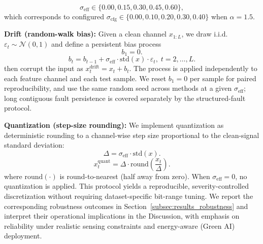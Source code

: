 \documentclass[review,1p,times]{elsarticle}
\begin{document}
\begin{equation}
\sigma_{\mathrm{eff}} \in \{0.00, 0.15, 0.30, 0.45, 0.60\},
\end{equation}
which corresponds to configured $\sigma_{\mathrm{cfg}}\in\{0.00,0.10,0.20,0.30,0.40\}$ when $\alpha=1.5$.

\noindent\textbf{Drift (random-walk bias):}
Given a clean channel $x_{1:L}$, we draw i.i.d.\ $\varepsilon_t\sim\mathcal{N}(0,1)$ and define a persistent bias process
\begin{equation}
b_1 = 0.
\end{equation}
\begin{equation}
b_t = b_{t-1} + \sigma_{\mathrm{eff}}\cdot \mathrm{std}(x)\cdot \varepsilon_t,\; t=2,\dots,L.
\end{equation}
then corrupt the input as $x^{\text{drift}}_t = x_t + b_t$. The process is applied independently to each feature channel and each test sample. We reset $b_1=0$ per sample for paired reproducibility, and use the same random seed across methods at a given $\sigma_{\mathrm{eff}}$; long contiguous fault persistence is covered separately by the structured-fault protocol.

\noindent\textbf{Quantization (step-size rounding):}
We implement quantization as deterministic rounding to a channel-wise step size proportional to the clean-signal standard deviation:
\begin{equation}
\Delta = \sigma_{\mathrm{eff}}\cdot \mathrm{std}(x).
\end{equation}
\begin{equation}
x^{\text{quant}}_t = \Delta\cdot \mathrm{round}\!\left(\frac{x_t}{\Delta}\right).
\end{equation}
where $\mathrm{round}(\cdot)$ is round-to-nearest (half away from zero). When $\sigma_{\mathrm{eff}}=0$, no quantization is applied. This protocol yields a reproducible, severity-controlled discretization without requiring dataset-specific bit-range tuning. We report the corresponding robustness outcomes in Section~\ref{subsec:results_robustness} and interpret their operational implications in the Discussion, with emphasis on reliability under realistic sensing constraints and energy-aware (Green AI) deployment.
\end{document}
